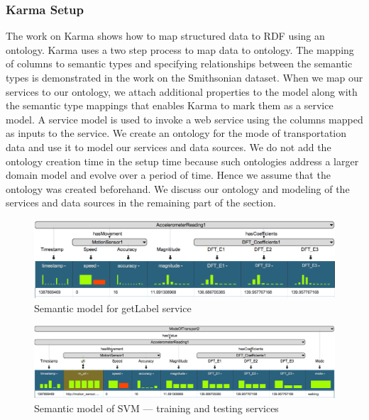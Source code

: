 \subsubsection{Karma Setup} 
The work on Karma\cite{knoblock12:eswc} shows how to map structured data to RDF using an ontology. Karma uses a two step process to map data to ontology. The mapping of columns to semantic types and specifying relationships between the semantic types is demonstrated in the work on the Smithsonian dataset\cite{szekely14:ijhac}. When we map our services to our ontology, we attach additional properties to the model along with the semantic type mappings that enables Karma to mark them as a service model. A service model is used to invoke a web service using the columns mapped as inputs to the service. We create an ontology for the mode of transportation data and use it to model our services and data sources. We do not add the ontology creation time in the setup time because such ontologies address a larger domain model and evolve over a period of time. Hence we assume that the ontology was created beforehand. We discuss our ontology and modeling of the services and data sources in the remaining part of the section.

\begin{figure}[ht!]
\centering
\includegraphics[width=180mm]{img/getLabelService}
\caption{Semantic model for getLabel service\label{fig:imgGetLabelService}}
\end{figure}

\begin{figure}[bp]
\centering
\includegraphics[width=180mm]{img/svmService}
\caption{Semantic model of SVM --- training and testing services\label{fig:svmService}}
\end{figure}


